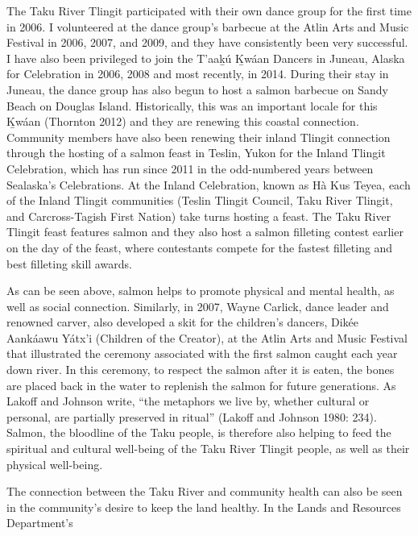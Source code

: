 The Taku River Tlingit participated with their own dance group for the first time in 2006. I volunteered at the dance group’s barbecue at the Atlin Arts and Music Festival in 2006, 2007, and 2009, and they have consistently been very successful. I have also been privileged to join the T'aak̲ú K̲wáan Dancers in Juneau, Alaska for Celebration in 2006, 2008 and most recently, in 2014. During their stay in Juneau, the dance group has also begun to host a salmon barbecue on Sandy Beach on Douglas Island. Historically, this was an important locale for this K̲wáan (Thornton 2012) and they are renewing this coastal connection. Community members have also been renewing their inland Tlingit connection through the hosting of a salmon feast in Teslin, Yukon for the Inland Tlingit Celebration, which has run since 2011 in the odd-numbered years between Sealaska’s Celebrations. At the Inland Celebration, known as Hà Kus Teyea, each of the Inland Tlingit communities (Teslin Tlingit Council, Taku River Tlingit, and Carcross-Tagish First Nation) take turns hosting a feast. The Taku River Tlingit feast features salmon and they also host a salmon filleting contest earlier on the day of the feast, where contestants compete for the fastest filleting and best filleting skill awards.

As can be seen above, salmon helps to promote physical and mental health, as well as social connection. Similarly, in 2007, Wayne Carlick, dance leader and renowned carver, also developed a skit for the children’s dancers, Dikée Aankáawu Yátx’i (Children of the Creator), at the Atlin Arts and Music Festival that illustrated the ceremony associated with the first salmon caught each year down river. In this ceremony, to respect the salmon after it is eaten, the bones are placed back in the water to replenish the salmon for future generations. As Lakoff and Johnson write, “the metaphors we live by, whether cultural or personal, are partially preserved in ritual” (Lakoff and Johnson 1980: 234). Salmon, the bloodline of the Taku people, is therefore also helping to feed the spiritual and cultural well-being of the Taku River Tlingit people, as well as their physical well-being.

The connection between the Taku River and community health can also be seen in the community’s desire to keep the land healthy. In the Lands and Resources Department’s

